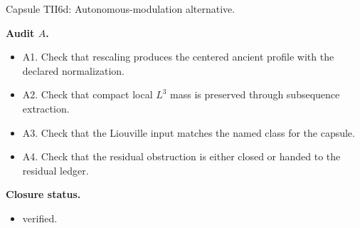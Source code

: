 \documentclass[11pt]{amsart}
\newcommand{\capsulefield}[1]{\par\smallskip\noindent\textbf{#1.}\ }
\begin{document}
\begin{proofcapsule}{Capsule TII6d: Autonomous-modulation alternative.}
  \capsulefield{Audit \(A\)}
  \begin{itemize}[leftmargin=1.8em]
  \item A1. Check that rescaling produces the centered ancient profile with the declared normalization.
  \item A2. Check that compact local $L^3$ mass is preserved through subsequence extraction.
  \item A3. Check that the Liouville input matches the named class for the capsule.
  \item A4. Check that the residual obstruction is either closed or handed to the residual ledger.
  \end{itemize}
  \capsulefield{Closure status}
  \begin{itemize}[leftmargin=1.8em]
  \item verified.
  \end{itemize}
\end{proofcapsule}
\end{document}
